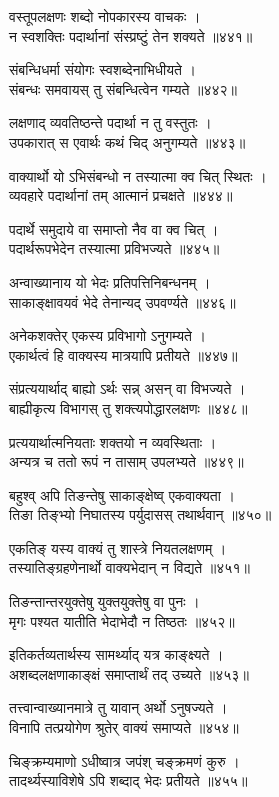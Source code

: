 वस्तूपलक्षणः शब्दो नोपकारस्य वाचकः ।\\न स्वशक्तिः पदार्थानां संस्प्रष्टुं तेन शक्यते ॥४४१॥

संबन्धिधर्मा संयोगः स्वशब्देनाभिधीयते ।\\संबन्धः समवायस् तु संबन्धित्वेन गम्यते ॥४४२॥

लक्षणाद् व्यवतिष्ठन्ते पदार्था न तु वस्तुतः ।\\उपकारात् स एवार्थः कथं चिद् अनुगम्यते ॥४४३॥

वाक्यार्थो यो ऽभिसंबन्धो न तस्यात्मा क्व चित् स्थितः ।\\व्यवहारे पदार्थानां तम् आत्मानं प्रचक्षते ॥४४४॥

पदार्थे समुदाये वा समाप्तो नैव वा क्व चित् ।\\पदार्थरूपभेदेन तस्यात्मा प्रविभज्यते ॥४४५॥

अन्वाख्यानाय यो भेदः प्रतिपत्तिनिबन्धनम् ।\\साकाङ्क्षावयवं भेदे तेनान्यद् उपवर्ण्यते ॥४४६॥

अनेकशक्तेर् एकस्य प्रविभागो ऽनुगम्यते ।\\एकार्थत्वं हि वाक्यस्य मात्रयापि प्रतीयते ॥४४७॥

संप्रत्ययार्थाद् बाह्यो ऽर्थः सन्न् असन् वा विभज्यते ।\\बाह्यीकृत्य विभागस् तु शक्त्यपोद्धारलक्षणः ॥४४८॥

प्रत्ययार्थात्मनियताः शक्तयो न व्यवस्थिताः ।\\अन्यत्र च ततो रूपं न तासाम् उपलभ्यते ॥४४९॥

बहुश्व् अपि तिङन्तेषु साकाङ्क्षेष्व् एकवाक्यता ।\\तिङा तिङ्भ्यो निघातस्य पर्युदासस् तथार्थवान् ॥४५०॥

एकतिङ् यस्य वाक्यं तु शास्त्रे नियतलक्षणम् ।\\तस्यातिङ्ग्रहणेनार्थो वाक्यभेदान् न विद्यते ॥४५१॥

तिङन्तान्तरयुक्तेषु युक्तयुक्तेषु वा पुनः ।\\मृगः पश्यत यातीति भेदाभेदौ न तिष्ठतः ॥४५२॥

इतिकर्तव्यतार्थस्य सामर्थ्याद् यत्र काङ्क्ष्यते ।\\अशब्दलक्षणाकाङ्क्षं समाप्तार्थं तद् उच्यते ॥४५३॥

तत्त्वान्वाख्यानमात्रे तु यावान् अर्थो ऽनुषज्यते ।\\विनापि तत्प्रयोगेण श्रुतेर् वाक्यं समाप्यते ॥४५४॥

चिङ्क्रम्यमाणो ऽधीष्वात्र जपंश् चङ्क्रमणं कुरु ।\\तादर्थ्यस्याविशेषे ऽपि शब्दाद् भेदः प्रतीयते ॥४५५॥

